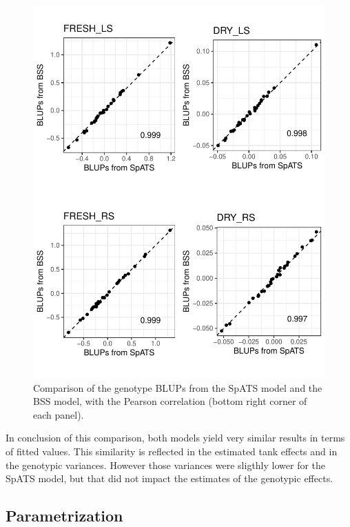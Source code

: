  
 \begin{figure}
	\centering
	\includegraphics[width=\textwidth]{../../Figures/Genotype_Comparative_plots.pdf} 
	\caption[Comparison of the genotype BLUPs from the SpATS model and the BSS model]{Comparison of the genotype BLUPs from the SpATS model and the BSS model, with the Pearson correlation (bottom right corner of each panel).}
	\label{fig:genotype_comparison_BSS_SPATS}
\end{figure}

In conclusion of this comparison, both models yield very similar results in terms of fitted values. This similarity is reflected in the estimated tank effects and in the genotypic variances. However those variances were sligthly lower for the SpATS model, but that did not impact the estimates of the genotypic effects.\\

\subsection{Parametrization}

